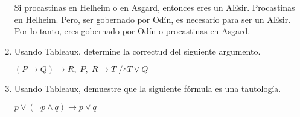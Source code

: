\documentclass[letterpaper,11pt]{article}
\begin{document}
\begin{enumerate}
    Si procastinas en Helheim o en Asgard, entonces eres un AEsir. Procastinas 
    en Helheim. Pero, ser gobernado por Odín, es necesario para ser un AEsir. 
    Por lo tanto, eres gobernado por Odín o procastinas en Asgard.

    \item Usando Tableaux, determine la correctud del siguiente argumento.

    \begin{center}
        $(P → Q) → R, \; P, \; R → T \; /∴ T \lor Q$
    \end{center}

    \item Usando Tableaux, demuestre que la siguiente fórmula es una tautología.

    \begin{center}
        $p \lor (\neg p \land q) → p \lor q$
    \end{center}
\end{enumerate}
\end{document}
